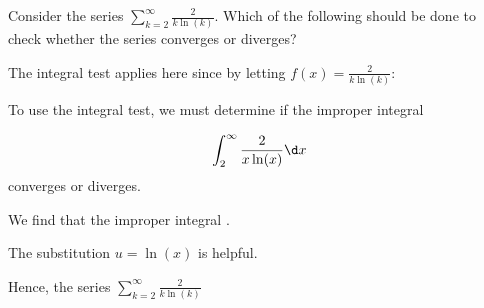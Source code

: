 \documentclass{ximera}
\author{Jim Talamo}
\begin{document}
\begin{exercise}
Consider the series $\sum_{k=2}^{\infty} \frac{2}{k\ln(k)}$.  Which of the following should be done to check whether the series converges or diverges?
\begin{multipleChoice}
\end{multipleChoice}

\begin{exercise}
The integral test applies here since by letting $f(x) = \frac{2}{k\ln(k)}$:
\begin{selectAll}
\end{selectAll}

To use the integral test, we must determine if the improper integral

\[
\int_2^{\infty} \frac{2}{x\ln(x)} \d x
\]
converges or diverges.

We find that the improper integral .

\begin{hint}
The substitution $u=\ln(x)$ is helpful.
\end{hint}
\begin{exercise}

Hence, the series  $\sum_{k=2}^{\infty} \frac{2}{k\ln(k)}$
\begin{multipleChoice}
\end{multipleChoice}
\end{exercise}
\end{exercise}
\end{exercise}
\end{document}
